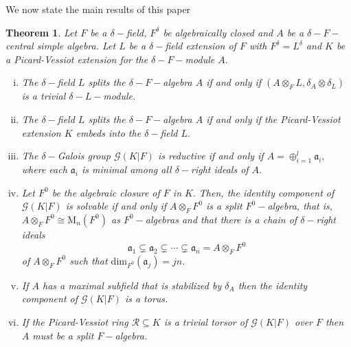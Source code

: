 \documentclass[preprint, 11pt]{amsart}
\newtheorem{theorem}{Theorem}[section]
\theoremstyle{corollary}
\theoremstyle{remark}
\theoremstyle{proposition}
\numberwithin{equation}{subsection}
\begin{document}
We now state the main results of this paper
\begin{theorem}\label{Mainresult} Let $F$ be a $\delta-$field, $F^\delta$ be algebraically closed  and $A$ be a $\delta-F-$central simple algebra. Let $L$ be a $\delta-$field extension of $F$ with $F^{\delta}=L^{\delta}$ and $K$ be a Picard-Vessiot extension for the $\delta-F-$module $A.$ 
	
	\begin{enumerate}[(i)] \item  \label{split-trivial-equivalence}   The $\delta-$field $L$ splits the $\delta-F-$algebra $A$ if and only if $(A\otimes_F L, \delta_A\otimes \delta_L)$ is a trivial $\delta-L-$module.
		\item  \label{existence-minimal} The $\delta-$field  $L$ splits the $\delta-F-$algebra $A$ if and only if the Picard-Vessiot extension $K$ embeds  into the $\delta-$field $L.$
		 
		\item \label{reductivecase} The $\delta-$Galois group $\mathscr{G}(K|F)$ is  reductive  if and only if $A=\oplus^l_{i=1}\mathfrak{a}_i,$ where each $\mathfrak{a}_i$ is minimal among all $\delta-$right ideals of $A.$ 
		
		\item \label{liouvilliancase} Let $F^0$ be the algebraic closure of $F$ in $K.$ Then, the identity component of $\mathscr{G}(K|F)$ is  solvable if and only if $A\otimes_F F^0$ is a split $F^0-$algebra, that is, $A\otimes_F F^0\cong \mathrm{M}_n(F^0)$ as $F^0-$algebras and that there is a chain of $\delta-$right ideals $$\mathfrak a_1\subsetneq \mathfrak a_2\subsetneq\cdots\subsetneq \mathfrak a_n=A\otimes_F F^0$$ of $A\otimes_F F^0$ such that $\mathrm{dim}_{F^0}(\mathfrak a_j)=jn.$ 
	\item \label{maxstable} If $A$ has a  maximal subfield that is stabilized by $\delta_A$  then  the identity component of $\mathscr{G}(K|F)$ is a torus.
	
\item \label{trivialtorsor}If the Picard-Vessiot ring $\mathscr R\subseteq K$ is a trivial torsor of $\mathscr G(K|F)$ over $F$ then $A$ must be a split $F-$algebra.
\end{enumerate}
		\end{theorem}
\end{document}
